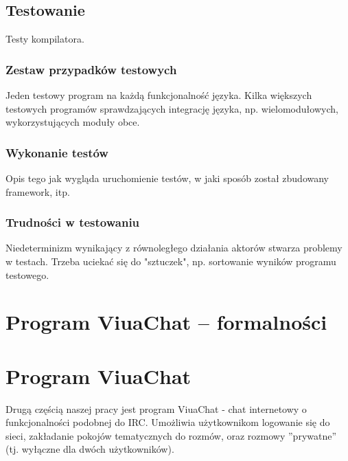 \documentclass[11pt,oneside,a4paper,titlepage,onecolumn]{book}
\begin{document}




\section{Testowanie}

Testy kompilatora.

\subsection{Zestaw przypadków testowych}

Jeden testowy program na każdą funkcjonalność języka.
Kilka większych testowych programów sprawdzających integrację języka, np. wielomodułowych, wykorzystujących
moduły obce.

\subsection{Wykonanie testów}

Opis tego jak wygląda uruchomienie testów, w jaki sposób został zbudowany framework, itp.

\subsection{Trudności w testowaniu}

Niedeterminizm wynikający z równoległego działania aktorów stwarza problemy w testach. Trzeba uciekać się do
"sztuczek", np. sortowanie wyników programu testowego.



\chapter{Program ViuaChat -- formalności}



\chapter{Program ViuaChat}
\label{program_viuachat}

Drugą częścią naszej pracy jest program ViuaChat - chat internetowy o funkcjonalności podobnej do IRC.
Umożliwia użytkownikom logowanie się do sieci, zakładanie pokojów tematycznych do rozmów, oraz rozmowy
''prywatne'' (tj. wyłączne dla dwóch użytkowników).


\end{document}
